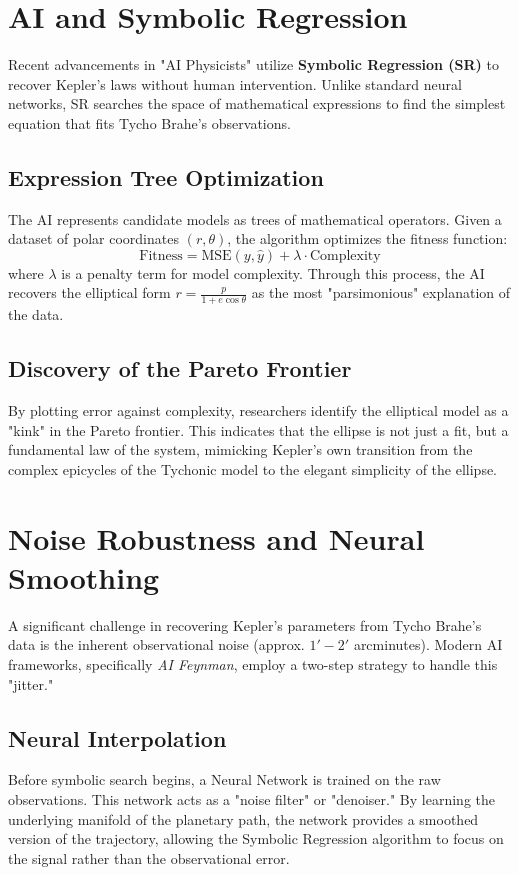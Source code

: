 \documentclass[11pt]{article}
\begin{document}
\section{AI and Symbolic Regression}
Recent advancements in "AI Physicists" utilize \textbf{Symbolic Regression (SR)} to recover Kepler's laws without human intervention. Unlike standard neural networks, SR searches the space of mathematical expressions to find the simplest equation that fits Tycho Brahe's observations.

\subsection{Expression Tree Optimization}
The AI represents candidate models as trees of mathematical operators. Given a dataset of polar coordinates $(r, \theta)$, the algorithm optimizes the fitness function:
\begin{equation}
\text{Fitness} = \text{MSE}(y, \hat{y}) + \lambda \cdot \text{Complexity}
\end{equation}
where $\lambda$ is a penalty term for model complexity. Through this process, the AI recovers the elliptical form $r = \frac{p}{1+e\cos\theta}$ as the most "parsimonious" explanation of the data.

\subsection{Discovery of the Pareto Frontier}
By plotting error against complexity, researchers identify the elliptical model as a "kink" in the Pareto frontier. This indicates that the ellipse is not just a fit, but a fundamental law of the system, mimicking Kepler's own transition from the complex epicycles of the Tychonic model to the elegant simplicity of the ellipse.

\section{Noise Robustness and Neural Smoothing}
A significant challenge in recovering Kepler's parameters from Tycho Brahe's data is the inherent observational noise (approx. $1' - 2'$ arcminutes). Modern AI frameworks, specifically \textit{AI Feynman}, employ a two-step strategy to handle this "jitter."

\subsection{Neural Interpolation}
Before symbolic search begins, a Neural Network is trained on the raw observations. This network acts as a "noise filter" or "denoiser." By learning the underlying manifold of the planetary path, the network provides a smoothed version of the trajectory, allowing the Symbolic Regression algorithm to focus on the signal rather than the observational error.
\end{document}
